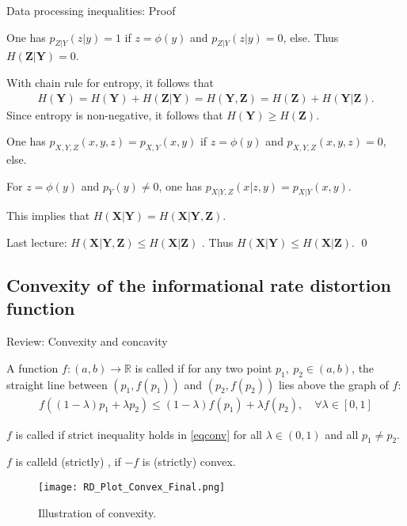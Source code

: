 \begin{frame}{Data processing inequalities: Proof}
\bit 
\item One has $p_{Z|Y}(z|y)=1$ if $z=\phi(y)$ and $p_{Z|Y}(z|y)=0$, else. Thus 
$H(\mathbf{Z}|\mathbf{Y})=0$.
\item With chain rule for entropy, it follows that
\begin{align*}
H(\mathbf{Y})=H(\mathbf{Y})+H(\mathbf{Z}|\mathbf{Y})=H(\mathbf{Y},\mathbf{Z})=H(\mathbf{Z})+H(\mathbf{Y}|\mathbf{Z}).
\end{align*}
Since entropy is non-negative, it follows that $H(\mathbf{Y})\geq H(\mathbf{Z})$.
\item 
One has $p_{X,Y,Z}(x,y,z)=p_{X,Y}(x,y)$ if $z=\phi(y)$ and $p_{X,Y,Z}(x,y,z)=0$, else. 
\item For $z=\phi(y)$ and 
$p_Y(y)\neq 0$, one has $p_{X|Y,Z}(x|z,y)=p_{X|Y}(x,y)$. 
\item[\iarrow] This implies that $H(\mathbf{X}|\mathbf{Y})=H(\mathbf{X}|\mathbf{Y},\mathbf{Z})$.
\item Last lecture: $H(\mathbf{X}|\mathbf{Y},\mathbf{Z})\leq H(\mathbf{X}|\mathbf{Z})$ .
Thus $H(\mathbf{X}|\mathbf{Y})\leq H(\mathbf{X}|\mathbf{Z})$. \qed
\eit 
\end{frame}


\subsection{Convexity of the informational rate distortion function}
\begin{frame}{Review: Convexity and concavity}
\bit
\item A function $f:(a,b)\to\mathbb{R}$ is called  if for any two point $p_1,\:p_2\in (a,b)$, the straight
line between $(p_1, f(p_1))$ and $(p_2, f(p_2))$ lies above the graph of $f$:
\begin{align}\label{eqconv}
f((1-\lambda)p_1+\lambda p_2)\leq (1-\lambda)f(p_1)+\lambda f(p_2), \quad \forall \lambda\in [0,1] 
\end{align}  
\item  $f$ is called  if strict inequality holds in \eqref{eqconv} for all $\lambda\in (0,1)$ and 
all $p_1\neq p_2$. 
\item $f$ is calleld (strictly) , if $-f$ is (strictly) convex. 
\eit
\begin{figure}
\texttt{[image: RD\_Plot\_Convex\_Final.png]}
\captionsetup{labelformat=empty}
\caption{Illustration of convexity.}
\end{figure}
\end{frame}

